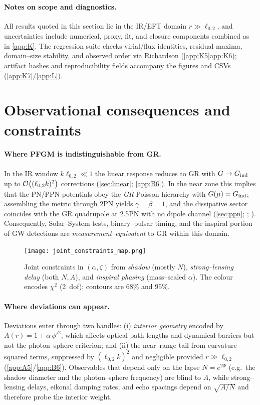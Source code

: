 \documentclass{iopjournal}
\begin{document}
\paragraph{Notes on scope and diagnostics.}
All results quoted in this section lie in the IR/EFT domain \(r\gg\ell_{0,2}\), and uncertainties include numerical, proxy, fit, and closure components combined as in \cref{app:K}. The regression suite checks virial/flux identities, residual maxima, domain–size stability, and observed order via Richardson (\cref{app:K5}{app:K6}); artifact hashes and reproducibility fields accompany the figures and CSVs (\cref{app:K7}/\cref{app:L}).

\section{Observational consequences and constraints}\label{sec:obs}
\paragraph{Where PFGM is indistinguishable from GR.}
In the IR window $k\ell_{0,2}\ll1$ the linear response reduces to GR with $G\to G_{\rm ind}$ up to $\order{(\ell_{0,2}k)^2}$ corrections (\cref{sec:linear}; \cref{app:B6}). In the near zone this implies that the PN/PPN potentials obey the \emph{GR} Poisson hierarchy with $G(\mu)=G_{\rm ind}$; assembling the metric through 2PN yields $\gamma=\beta=1$, and the dissipative sector coincides with the GR quadrupole at 2.5PN with no dipole channel (\cref{sec:ppn}; ; \cite{PoissonWill2014,Will2014LRR,Blanchet2014LRR}). Consequently, Solar–System tests, binary–pulsar timing, and the inspiral portion of GW detections are \emph{measurement–equivalent} to GR within this domain.

\begin{figure}[t]
\centering
\texttt{[image: joint\_constraints\_map.png]}
\caption{Joint constraints in \((\alpha,\zeta)\) from \textit{shadow} (mostly \(N\)), \textit{strong--lensing delay} (both \(N,A\)), and \textit{inspiral phasing} (mass--scaled \(\alpha\)). The colour encodes \(\chi^2\) (2~dof); contours are \(68\%\) and \(95\%\).}
\label{fig:joint-constraints}
\end{figure}


\paragraph{Where deviations can appear.}
Deviations enter through two handles: (i) \emph{interior geometry} encoded by $A(r)=1+\alpha\,\phi'^2$, which affects optical path lengths and dynamical barriers but not the photon–sphere criterion; and (ii) the near–range tail from curvature–squared terms, suppressed by $(\ell_{0,2}k)^2$ and negligible provided $r\gg \ell_{0,2}$ (\cref{app:A5}/\cref{app:B6}). Observables that depend only on the lapse $N=e^{2\Phi}$ (e.g.\ the shadow diameter and the photon–sphere frequency) are blind to $A$, while strong–lensing delays, eikonal damping rates, and echo spacings depend on $\sqrt{A/N}$ and therefore probe the interior weight.
\end{document}

